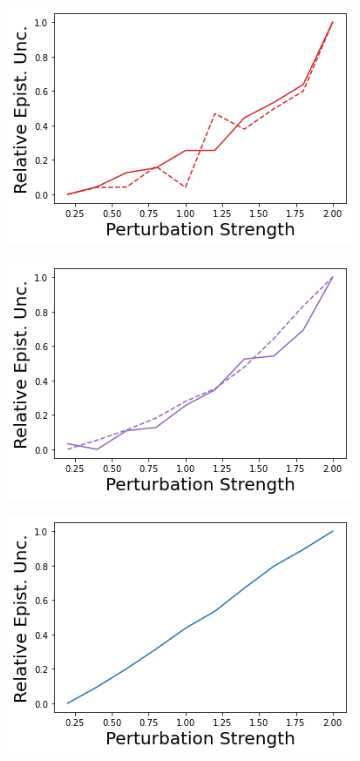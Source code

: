 \begin{figure}
    \begin{subfigure}{.24\textwidth}
        \includegraphics[width=\textwidth]{sections/011_icml2022/resources/state_shift-DropOut-AcrobotShift-v0-mean_epistemic_uncertainty_.png}
    \end{subfigure}
    \begin{subfigure}{.24\textwidth}
        \includegraphics[width=\textwidth]{sections/011_icml2022/resources/state_shift-Ensemble-AcrobotShift-v0-mean_epistemic_uncertainty_.png}
    \end{subfigure}
    \begin{subfigure}{.24\textwidth}
        \includegraphics[width=\textwidth]{sections/011_icml2022/resources/state_shift-DKL-AcrobotShift-v0-mean_epistemic_uncertainty_.png}

\end{subfigure}
\end{figure}
